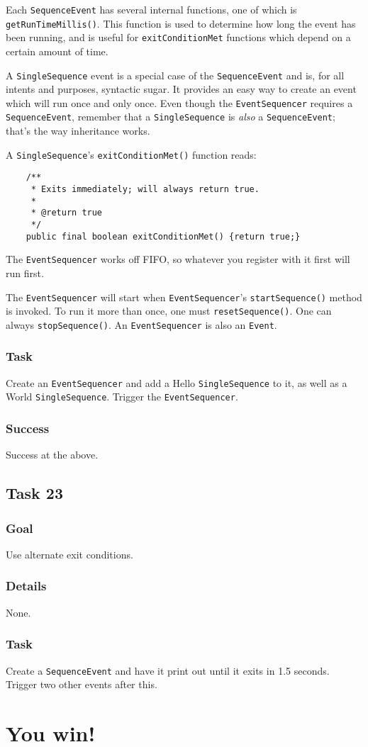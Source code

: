 \documentclass[a4paper]{article}
\begin{document}
Each \lstinline{SequenceEvent} has several internal functions, one of which is \lstinline{getRunTimeMillis()}. This function is used to determine how long the event has been running, and is useful for \lstinline{exitConditionMet} functions which depend on a certain amount of time.

A \lstinline{SingleSequence} event is a special case of the \lstinline{SequenceEvent} and is, for all intents and purposes, syntactic sugar. It provides an easy way to create an event which will run once and only once. Even though the \lstinline{EventSequencer} requires a \lstinline{SequenceEvent}, remember that a \lstinline{SingleSequence} is \textit{also} a \lstinline{SequenceEvent}; that's the way inheritance works.

A \lstinline{SingleSequence}'s \lstinline{exitConditionMet()} function reads:

\begin{verbatim}
	/**
	 * Exits immediately; will always return true.
	 * 
	 * @return true
	 */
	public final boolean exitConditionMet() {return true;}
\end{verbatim}

The \lstinline{EventSequencer} works off FIFO, so whatever you register with it first will run first.

The \lstinline{EventSequencer} will start when \lstinline{EventSequencer}'s \lstinline{startSequence()} method is invoked. To run it more than once, one must \lstinline{resetSequence()}. One can always \lstinline{stopSequence()}. An \lstinline{EventSequencer} is also an \lstinline{Event}.
\subsubsection{Task} Create an \lstinline{EventSequencer} and add a Hello \lstinline{SingleSequence} to it, as well as a World \lstinline{SingleSequence}. Trigger the \lstinline{EventSequencer}.
\subsubsection{Success} Success at the above.

\subsection{Task 23}
\subsubsection{Goal} Use alternate exit conditions.
\subsubsection{Details} None.
\subsubsection{Task} Create a \lstinline{SequenceEvent} and have it print out until it exits in 1.5 seconds. Trigger two other events after this.

\section*{You win!}
\end{document}
